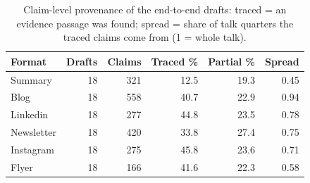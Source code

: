 \begin{table}[t]
\centering
\caption{Claim-level provenance of the end-to-end drafts: traced = an evidence passage was found; spread = share of talk quarters the traced claims come from (1 = whole talk).}
\label{tab:provenance}
\footnotesize
\setlength{\tabcolsep}{2.5pt}
\begin{tabular}{lrrrrr}
\toprule
Format & Drafts & Claims & Traced \% & Partial \% & Spread \\
\midrule
Summary & 18 & 321 & 12.5 & 19.3 & 0.45 \\
Blog & 18 & 558 & 40.7 & 22.9 & 0.94 \\
Linkedin & 18 & 277 & 44.8 & 23.5 & 0.78 \\
Newsletter & 18 & 420 & 33.8 & 27.4 & 0.75 \\
Instagram & 18 & 275 & 45.8 & 23.6 & 0.71 \\
Flyer & 18 & 166 & 41.6 & 22.3 & 0.58 \\
\bottomrule
\end{tabular}
\end{table}
